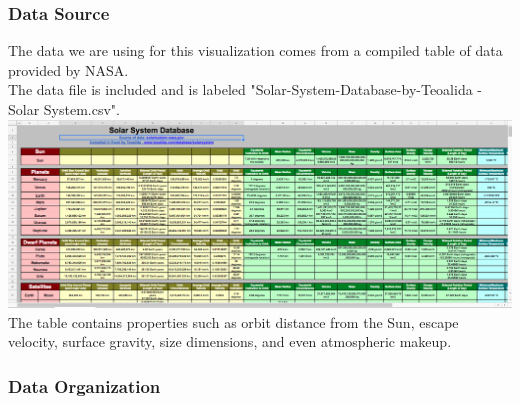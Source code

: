 \documentclass[journal]{vgtc}                %
\begin{document}
\subsubsection{Data Source}

The data we are using for this visualization comes from a compiled table of data provided by NASA.\\

\noindent The data file is included and is labeled "Solar-System-Database-by-Teoalida - Solar System.csv".\\
\includegraphics[width=\linewidth]{solar_data}
The table contains properties such as orbit distance from the Sun, escape velocity, surface gravity, size dimensions, and even atmospheric makeup.
\subsubsection{Data Organization}
\end{document}
